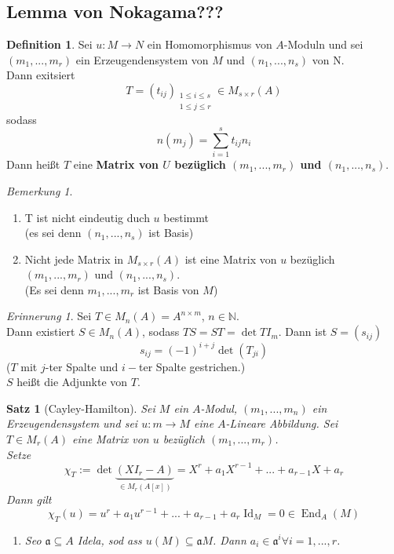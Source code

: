 \documentclass[10pt,a4paper]{article}
\newcommand{\N}{\ensuremath{\mathbb{N}}}
\newcounter{thm}[section]
\theoremstyle{definition}
\newtheorem{definition}[thm]{Definition}
\theoremstyle{plain}
\newtheorem{satz}[thm]{Satz}
\theoremstyle{remark}
\newtheorem{bem}[thm]{Bemerkung}
\newtheorem{rem}[thm]{Erinnerung}
\begin{document}
\subsection{Lemma von Nokagama???}
\begin{definition}
	Sei $u:M\rightarrow N$ ein Homomorphismus von $A$-Moduln und sei $(m_1,...,m_r)$ ein Erzeugendensystem von $M$ und $(n_1,...,n_s)$ von N.\\
	Dann exitsiert
	\[T=(t_{ij})_{\substack{1\le i\le s\\ 1\le j\le r}}\in M_{s\times r}(A)\]
	sodass
	\[n(m_j)=\sum_{i=1}^{s}t_{ij}n_i\]
	Dann heißt $T$ eine \textbf{Matrix von $U$ bezüglich $(m_1,...,m_r)$ und $(n_1,...,n_s)$}.
\end{definition}
\begin{bem}
	\begin{enumerate}
		\item T ist nicht eindeutig duch $u$ bestimmt\\
		(es sei denn $(n_1,...,n_s)$ ist Basis)
		\item Nicht jede Matrix in $M_{s\times r}(A)$ ist eine Matrix von $u$ bezüglich $(m_1,...,m_r)$ und $(n_1,...,n_s)$.\\
		(Es sei denn $m_1,...,m_r$ ist Basis von $M$)
	\end{enumerate}
\end{bem}
\begin{rem}
	Sei $T\in M_n(A)=A^{n\times m}$, $n\in \N$.\\
	Dann existiert $S\in M_n(A)$, sodass $TS=ST=\det TI_m$. Dann ist $S=(s_{ij})$
	\[s_{ij}=(-1)^{i+j}\det(T_{ji})\]
	($T$ mit $j$-ter Spalte und $i-$ter Spalte gestrichen.)\\
	$S$ heißt die Adjunkte von $T$.
\end{rem}
\begin{satz}[Cayley-Hamilton]
	\label{423CayHam}
	Sei $M$ ein $A$-Modul, $(m_1,...,m_n)$ ein Erzeugendensystem und sei $u:m\rightarrow M$ eine $A$-Lineare Abbildung. Sei $T\in M_r(A)$ eine Matrix von $u$ bezüglich $(m_1,...,m_r)$.\\
	Setze
	\[\chi_T:=\det\underbrace{(X I_r-A)}_{\in M_r(A[x])}=X^r+a_1X^{r-1}+...+a_{r-1}X+a_r\]
	Dann gilt
	\[\chi_T(u)=u^r+a_1u^{r-1}+...+a_{r-1}+a_r\operatorname{Id}_M=0\in\operatorname{End}_A(M)\]
	\begin{enumerate}
		\item Seo $\mathfrak a\subseteq A$ Idela, sod ass $u(M)\subseteq\mathfrak aM$. Dann $a_i\in\mathfrak a^i\forall i=1,...,r$.
	\end{enumerate}
\end{satz}
\end{document}
